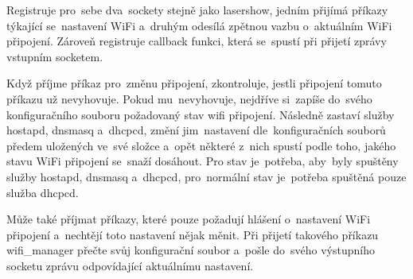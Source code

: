 Registruje pro~sebe dva~sockety stejně jako lasershow, jedním přijímá příkazy týkající se~nastavení WiFi a~druhým odesílá zpětnou vazbu o~aktuálním WiFi připojení. Zároveň registruje callback funkci, která se~spustí při přijetí zprávy vstupním socketem.

Když příjme příkaz pro~změnu připojení, zkontroluje, jestli připojení tomuto příkazu už nevyhovuje. Pokud mu~nevyhovuje, nejdříve si~zapíše do~svého konfiguračního souboru požadovaný stav wifi připojení. Následně zastaví služby hostapd, dnsmasq a~dhcpcd, změní jim~nastavení dle~konfiguračních souborů předem uložených ve~své složce a~opět některé z~nich spustí podle toho, jakého stavu WiFi připojení se~snaží dosáhout.
Pro  stav je~potřeba, aby~byly spuštěny služby hostapd, dnsmasq a~dhcpcd, pro~normální  stav je~potřeba spuštěná pouze služba dhcpcd.

Může také příjmat příkazy, které pouze požadují hlášení o~nastavení WiFi připojení a~nechtějí toto nastavení nějak měnit. Při přijetí takového příkazu wifi\_manager přečte svůj konfigurační soubor a~pošle do~svého výstupního socketu zprávu odpovídající aktuálnímu nastavení.
